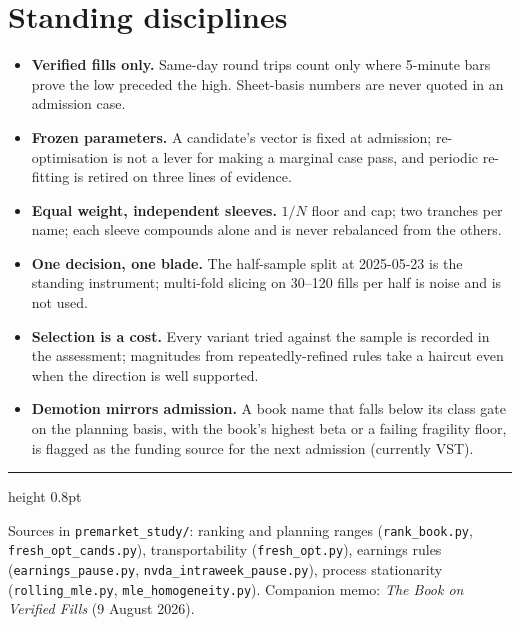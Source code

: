 \documentclass[11pt,a4paper]{article}
\begin{document}
\section{Standing disciplines}

\begin{itemize}
  \item \textbf{Verified fills only.} Same-day round trips count only where
        5-minute bars prove the low preceded the high. Sheet-basis numbers are
        never quoted in an admission case.
  \item \textbf{Frozen parameters.} A candidate's vector is fixed at admission;
        re-optimisation is not a lever for making a marginal case pass, and
        periodic re-fitting is retired on three lines of evidence.
  \item \textbf{Equal weight, independent sleeves.} $1/N$ floor and cap; two
        tranches per name; each sleeve compounds alone and is never rebalanced
        from the others.
  \item \textbf{One decision, one blade.} The half-sample split at 2025-05-23 is
        the standing instrument; multi-fold slicing on 30--120 fills per half is
        noise and is not used.
  \item \textbf{Selection is a cost.} Every variant tried against the sample is
        recorded in the assessment; magnitudes from repeatedly-refined rules take
        a haircut even when the direction is well supported.
  \item \textbf{Demotion mirrors admission.} A book name that falls below its
        class gate on the planning basis, with the book's highest beta or a
        failing fragility floor, is flagged as the funding source for the next
        admission (currently VST).
\end{itemize}

\vspace{0.5cm}
{\color{bcnavy}\hrule height 0.8pt}
\vspace{0.2cm}
{\footnotesize\color{bcgrey} Sources in \texttt{premarket\_study/}: ranking and
planning ranges (\texttt{rank\_book.py}, \texttt{fresh\_opt\_cands.py}),
transportability (\texttt{fresh\_opt.py}), earnings rules
(\texttt{earnings\_pause.py}, \texttt{nvda\_intraweek\_pause.py}), process
stationarity (\texttt{rolling\_mle.py}, \texttt{mle\_homogeneity.py}). Companion
memo: \emph{The Book on Verified Fills} (9 August 2026).}
\end{document}
